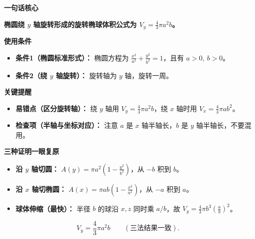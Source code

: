 \begin{summarybox}

\textbf{\textcolor{CSummary}{一句话核心}}

\textbf{椭圆绕 $y$ 轴旋转形成的旋转椭球体积公式为 $V_y = \frac{4}{3}\pi a^2 b$。}

\medskip
\textbf{\textcolor{CSummary}{使用条件}}
\begin{itemize}[leftmargin=*, itemsep=0.5em, topsep=0.4em]
    \item \textbf{条件1（椭圆标准形式）：} 椭圆方程为 $\frac{x^2}{a^2}+\frac{y^2}{b^2}=1$，且有 $a>0,\ b>0$。
    \item \textbf{条件2（绕 $y$ 轴旋转）：} 旋转轴为 $y$ 轴，旋转一周。
\end{itemize}

\medskip
\textbf{\textcolor{CSummary}{关键提醒}}
\begin{itemize}[leftmargin=*, itemsep=0.5em, topsep=0.4em]
    \item \textbf{易错点（区分旋转轴）：} 绕 $y$ 轴用 $V_y = \frac{4}{3}\pi a^2 b$，绕 $x$ 轴时用 $V_x = \frac{4}{3}\pi a b^2$。
    \item \textbf{检查项（半轴与坐标对应）：} 注意 $a$ 是 $x$ 轴半轴长，$b$ 是 $y$ 轴半轴长，不要混用。
\end{itemize}


\medskip
\textbf{\textcolor{CSummary}{三种证明一眼复原}}
\begin{itemize}[leftmargin=*, itemsep=0.45em, topsep=0.4em]
    \item \textbf{沿 $y$ 轴切圆：} $A(y)=\pi a^2\left(1-\frac{y^2}{b^2}\right)$，从 $-b$ 积到 $b$。
    \item \textbf{沿 $x$ 轴切椭圆：} $A(x)=\pi ab\left(1-\frac{x^2}{a^2}\right)$，从 $-a$ 积到 $a$。
    \item \textbf{球体伸缩（最快）：} 半径 $b$ 的球沿 $x,z$ 同时乘 $a/b$，故 $V_y=\frac43\pi b^3\left(\frac ab\right)^2$。
\end{itemize}
\[
   \boxed{V_y=\frac43\pi a^2b}
   \qquad(\text{三法结果一致}).
\]

\end{summarybox}
